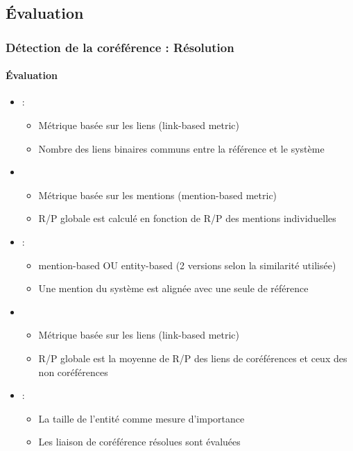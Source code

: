 \documentclass[xcolor=table]{beamer}
\begin{document}
\subsection{Évaluation}

\begin{frame}
	\frametitle{Détection de la coréférence : Résolution}
	\framesubtitle{Évaluation}
	
	\begin{itemize}
		\item {} : 
		\begin{itemize}
			\item Métrique basée sur les liens (link-based metric)
			\item Nombre des liens binaires communs entre la référence et le système
		\end{itemize}
		\item {}
		\begin{itemize}
			\item Métrique basée sur les mentions (mention-based metric)
			\item R/P globale est calculé en fonction de R/P des mentions individuelles
		\end{itemize}
		\item {} : 
		\begin{itemize}
			\item mention-based OU entity-based (2 versions selon la similarité utilisée)
			\item Une mention du système est alignée avec une seule de référence
		\end{itemize}
		\item {} 
		\begin{itemize}
			\item Métrique basée sur les liens (link-based metric)
			\item R/P globale est la moyenne de R/P des liens de coréférences et ceux des non coréférences
		\end{itemize}
		\item {} : 
		\begin{itemize}
			\item La taille de l'entité comme mesure d'importance
			\item Les liaison de coréférence résolues sont évaluées
		\end{itemize}
	\end{itemize}
	
\end{frame}
\end{document}
